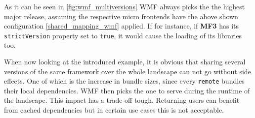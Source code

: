 As it can be seen in \ref{fig:wmf_multiversions} WMF always picks the the highest major release, assuming the respective micro frontends have the above shown configuration \ref{shared_mapping_wmf} applied. If for instance, if \textbf{MF3} has its \texttt{strictVersion} property set to \texttt{true}, it would cause the loading of its libraries too.

When now looking at the introduced example, it is obvious that sharing several versions of the same framework over the whole landscape can not go without side effects. One of which is the increase in bundle sizes, since every \texttt{remote} bundles their local dependencies. WMF then picks the one to serve during the runtime of the landscape.
This impact has a trade-off tough. Returning users can benefit from cached dependencies but in certain use cases this is not acceptable.\cite{wmf_multi_versions}
 
